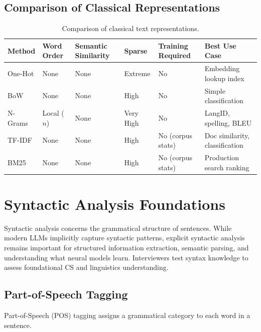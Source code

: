 \subsection{Comparison of Classical Representations}
\label{sec:repr_comparison}

\begin{table}[H]
\centering
\caption{Comparison of classical text representations.}
\label{tab:classical_repr}
\small
\begin{tabular}{@{}p{2.2cm}p{1.6cm}p{1.6cm}p{1.4cm}p{2.2cm}p{3.8cm}@{}}
\toprule
\textbf{Method} & \textbf{Word Order} & \textbf{Semantic Similarity} & \textbf{Sparse} & \textbf{Training Required} & \textbf{Best Use Case} \\
\midrule
One-Hot & None & None & Extreme & No & Embedding lookup index \\
BoW & None & None & High & No & Simple classification \\
N-Grams & Local ($n$) & None & Very High & No & LangID, spelling, BLEU \\
TF-IDF & None & None & High & No (corpus stats) & Doc similarity, classification \\
BM25 & None & None & High & No (corpus stats) & Production search ranking \\
\bottomrule
\end{tabular}
\end{table}

\section{Syntactic Analysis Foundations}
\label{sec:syntax}

Syntactic analysis concerns the grammatical structure of sentences. While modern LLMs
implicitly capture syntactic patterns, explicit syntactic analysis remains important for
structured information extraction, semantic parsing, and understanding what neural models
learn. Interviewers test syntax knowledge to assess foundational CS and linguistics
understanding.

\subsection{Part-of-Speech Tagging}
\label{sec:pos_tagging}

Part-of-Speech (POS) tagging assigns a grammatical category to each word in a sentence.


